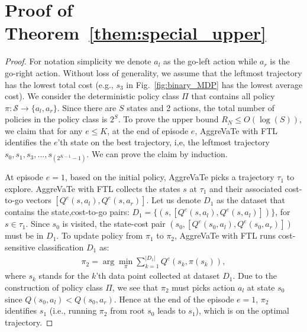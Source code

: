 \documentclass{article}
\begin{document}
\section{Proof of Theorem~\ref{them:special_upper}}
\label{sec:special_upper}
\begin{proof}
For notation simplicity we denote $a_l$ as the go-left action while $a_r$ is the go-right action. Without loss of generality, we assume that the leftmost trajectory has the lowest total cost (e.g., $s_3$ in Fig.~\ref{fig:binary_MDP} has the lowest average cost).
We consider the deterministic policy class $\Pi$ that contains all policy $\pi: \mathcal{S}\to \{a_l,a_r\}$. Since there are $S$ states and 2 actions, the total number of policies in the policy class is $2^S$. To prove the upper bound $R_N\leq O(\log(S))$, we claim that for any $e\leq K$, at the end of episode $e$, AggreVaTe with FTL identifies the $e$'th state on the best trajectory, i,e, the leftmost trajectory $s_0, s_1, s_3, ..., s_{(2^{K-1}-1)}$. We can prove the claim by induction. 

At episode $e=1$, based on the initial policy, AggreVaTe picks a trajectory $\tau_1$ to explore. %
AggreVaTe with FTL collects the states $s$ at $\tau_1$ and their associated cost-to-go vectors $[Q^e(s,a_l), Q^e(s,a_r)]$. Let us denote $D_1$ as the dataset that contains the state,cost-to-go pairs: $D_1 = \{(s, [Q^e(s,a_l),Q^e(s,a_l)])\}$, for $s\in \tau_1$. Since $s_0$ is visited, the state-cost pair $(s_0, [Q^e(s_0,a_l),Q^e(s_0,a_r)])$ must be in $D_1$. To update policy from $\pi_1$ to $\pi_2$, AggreVaTe with FTL runs cost-sensitive classification $D_1$ as:
\begin{align}
\label{eq:cs}
\pi_2 = \arg\min_{\pi}\sum_{k=1}^{|D_1|} Q^e(s_k, \pi(s_k)),
\end{align} where $s_k$ stands for the $k$'th data point collected at dataset $D_1$. Due to the construction of policy class $\Pi$, we see that $\pi_2$ must picks action $a_l$ at state $s_0$ since $Q(s_0,a_l)<Q(s_0,a_r)$. Hence at the end of the episode $e=1$, $\pi_2$ identifies $s_1$ (i.e., running $\pi_2$ from root $s_0$ leads to $s_1$), which is on the optimal trajectory.  


\end{proof}
\end{document}
